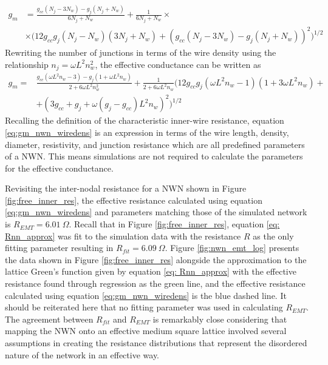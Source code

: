 \begin{align}
g_m &= \frac{g_{cc}(N_j - 3 N_w) - g_j(N_j+N_w)}{6 N_j + N_w} + \frac{1}{6 N_j + N_w} \times \nonumber \\
&\times \Big( 12 g_{cc} g_j (N_j - N_w) (3 N_j + N_w) + (g_{cc} (N_j - 3 N_w) - g_j (N_j + N_w))^2 \Big) ^{1/2}\label{Eq:gm_nwn_original}
\end{align}
Rewriting the number of junctions in terms of the wire density using the relationship $n_j = \omega L^2 n_w^2$, the effective conductance can be written as\cite{ocallaco2016}
\begin{eqnarray}
g_m = &\frac{g_{cc}(\omega L^2 n_w -3) - g_j (1 + \omega L^2 n_w)}{2+6\omega L^2 n_w^2} +\frac{1}{2+6\omega L^2 n_w} \Big( 12 g_{cc} g_j(\omega L^2 n_w -1)(1+3\omega L^2 n_w) \nonumber +\\
&+ (3 g_{cc} +g_j +\omega(g_j-g_{cc})L^2 n_w)^2 \Big)^{1/2} 
\label{eq:gm_nwn_wiredens}
\end{eqnarray}
Recalling the definition of the characteristic inner-wire resistance, equation \ref{eq:gm_nwn_wiredens} is an expression in terms of the wire length, density, diameter, resistivity, and junction resistance which are all predefined parameters of a NWN. This means simulations are not required to calculate the parameters for the effective conductance.

Revisiting the inter-nodal resistance for a NWN shown in Figure \ref{fig:free_inner_res}, the effective resistance calculated using equation \ref{eq:gm_nwn_wiredens} and parameters matching those of the simulated network is $R_{EMT} = 6.01~\Omega$. Recall that in Figure \ref{fig:free_inner_res}, equation \ref{eq: Rnn_approx} was fit to the simulation data with the resistance $R$ as the only fitting parameter resulting in $R_{fit} = 6.09~\Omega$. Figure \ref{fig:nwn_emt_log} presents the data shown in Figure \ref{fig:free_inner_res} alongside the approximation to the lattice Green's function given by equation \ref{eq: Rnn_approx} with the effective resistance found through regression as the green line, and the effective resistance calculated using equation \ref{eq:gm_nwn_wiredens} is the blue dashed line. It should be reiterated here that no fitting parameter was used in calculating $R_{EMT}$. The agreement between $R_{fit}$ and $R_{EMT}$ is remarkably close considering that mapping the NWN onto an effective medium square lattice involved several assumptions in creating the resistance distributions that represent the disordered nature of the network in an effective way.

